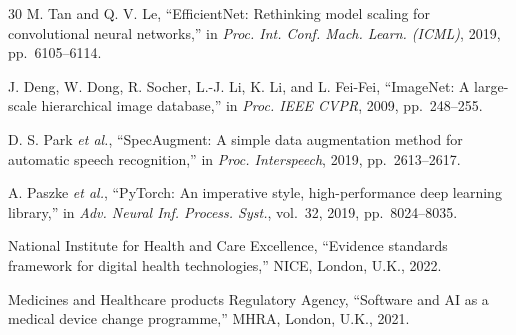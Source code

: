 \documentclass[conference]{IEEEtran}
\begin{document}
\begin{thebibliography}{30}
M. Tan and Q. V. Le, ``EfficientNet: Rethinking model scaling for convolutional neural networks,'' in \emph{Proc. Int. Conf. Mach. Learn. (ICML)}, 2019, pp.~6105--6114.

J. Deng, W. Dong, R. Socher, L.-J. Li, K. Li, and L. Fei-Fei, ``ImageNet: A large-scale hierarchical image database,'' in \emph{Proc. IEEE CVPR}, 2009, pp.~248--255.

D. S. Park \emph{et al.}, ``SpecAugment: A simple data augmentation method for automatic speech recognition,'' in \emph{Proc. Interspeech}, 2019, pp.~2613--2617.

A. Paszke \emph{et al.}, ``PyTorch: An imperative style, high-performance deep learning library,'' in \emph{Adv. Neural Inf. Process. Syst.}, vol.~32, 2019, pp.~8024--8035.

National Institute for Health and Care Excellence, ``Evidence standards framework for digital health technologies,'' NICE, London, U.K., 2022.

Medicines and Healthcare products Regulatory Agency, ``Software and AI as a medical device change programme,'' MHRA, London, U.K., 2021.

\end{thebibliography}
\end{document}
